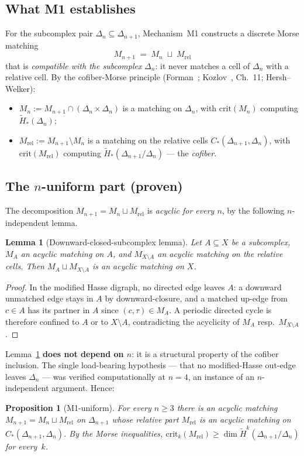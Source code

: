 \documentclass[11pt,reqno]{amsart}
\theoremstyle{plain}
\newtheorem{proposition}[theorem]{Proposition}
\newtheorem{lemma}[theorem]{Lemma}
\theoremstyle{definition}
\newcommand{\Hred}{\widetilde H}
\newcommand{\crit}{\mathrm{crit}}
\newcommand{\Mrel}{M_{\mathrm{rel}}}
\begin{document}
\subsection{What M1 establishes}\label{ssec:3.1}
For the subcomplex pair $\Delta_n\subseteq\Delta_{n+1}$, Mechanism~M1
constructs a discrete Morse matching
\[
  M_{n+1}\;=\;M_n\;\sqcup\;\Mrel
\]
that is \emph{compatible with the subcomplex} $\Delta_n$: it never
matches a cell of $\Delta_n$ with a relative cell. By the cofiber-Morse
principle (Forman~\cite{Forman1998}; Kozlov~\cite{Kozlov2008}, Ch.~11;
Hersh--Welker):
\begin{itemize}[leftmargin=1.6em]
  \item $M_n:=M_{n+1}\cap(\Delta_n\times\Delta_n)$ is a matching on
        $\Delta_n$, with $\crit(M_n)$ computing $\Hred_*(\Delta_n)$;
  \item $\Mrel:=M_{n+1}\setminus M_n$ is a matching on the relative
        cells $C_*(\Delta_{n+1},\Delta_n)$, with $\crit(\Mrel)$
        computing $\Hred_*(\Delta_{n+1}/\Delta_n)$ --- the
        \emph{cofiber}.
\end{itemize}

\subsection{The $n$-uniform part (proven)}\label{ssec:3.2}
The decomposition $M_{n+1}=M_n\sqcup\Mrel$ is \emph{acyclic for every
$n$}, by the following $n$-independent lemma.

\begin{lemma}[Downward-closed-subcomplex lemma]\label{lem:dcs}
Let $A\subseteq X$ be a subcomplex, $M_A$ an acyclic matching on $A$,
and $M_{X\setminus A}$ an acyclic matching on the relative cells. Then
$M_A\sqcup M_{X\setminus A}$ is an acyclic matching on $X$.
\end{lemma}
\begin{proof}
In the modified Hasse digraph, no directed edge leaves $A$: a downward
unmatched edge stays in $A$ by downward-closure, and a matched up-edge
from $c\in A$ has its partner in $A$ since $(c,\tau)\in M_A$. A periodic
directed cycle is therefore confined to $A$ or to $X\setminus A$,
contradicting the acyclicity of $M_A$ resp.\ $M_{X\setminus A}$.
\end{proof}

Lemma~\ref{lem:dcs} \textbf{does not depend on $n$}: it is a structural
property of the cofiber inclusion. The single load-bearing hypothesis ---
that no modified-Hasse out-edge leaves $\Delta_n$ --- was verified
computationally at $n=4$, an instance of an $n$-independent argument.
Hence:
\begin{proposition}[M1-uniform]\label{prop:M1uniform}
For every $n\ge3$ there is an acyclic matching
$M_{n+1}=M_n\sqcup\Mrel$ on $\Delta_{n+1}$ whose relative part $\Mrel$
is an acyclic matching on $C_*(\Delta_{n+1},\Delta_n)$. By the Morse
inequalities, $\crit_k(\Mrel)\ge\dim\Hred^k(\Delta_{n+1}/\Delta_n)$ for
every~$k$.
\end{proposition}
\end{document}
